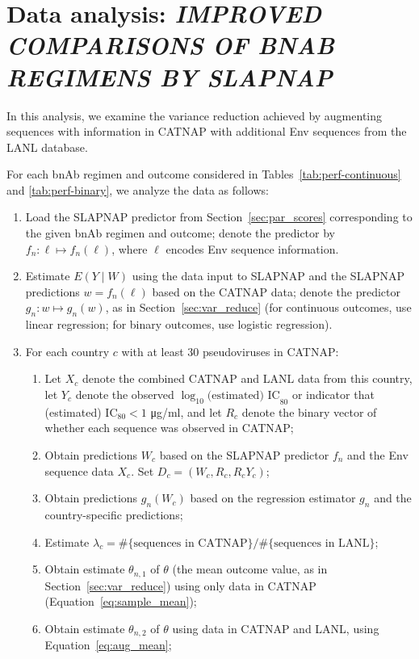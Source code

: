 \documentclass[10pt]{article}
\begin{document}
\section*{Data analysis: \textit{IMPROVED COMPARISONS OF BNAB REGIMENS BY SLAPNAP}}

In this analysis, we examine the variance reduction achieved by augmenting sequences with information in CATNAP with additional Env sequences from the LANL database.

For each bnAb regimen and outcome considered in Tables~\ref{tab:perf-continuous} and \ref{tab:perf-binary}, we analyze the data as follows:
\begin{enumerate}
  \item Load the SLAPNAP predictor from Section~\ref{sec:par_scores} corresponding to the given bnAb regimen and outcome; denote the predictor by $f_n: \ell \mapsto f_n(\ell)$, where $\ell$ encodes Env sequence information.
  \item Estimate $E(Y \mid W)$ using the data input to SLAPNAP and the SLAPNAP predictions $w = f_n(\ell)$ based on the CATNAP data; denote the predictor $g_n: w \mapsto g_n(w)$, as in Section~\ref{sec:var_reduce} (for continuous outcomes, use linear regression; for binary outcomes, use logistic regression).
  \item For each country $c$ with at least 30 pseudoviruses in CATNAP:
  \begin{enumerate}
    \item Let $X_c$ denote the combined CATNAP and LANL data from this country, let $Y_c$ denote the observed $\log_{10} \text{(estimated) IC}_{80}$ or indicator that (estimated) IC$_{80} < 1$ \si{\ug}/ml, and let $R_c$ denote the binary vector of whether each sequence was observed in CATNAP;
    \item Obtain predictions $W_c$ based on the SLAPNAP predictor $f_n$ and the Env sequence data $X_c$. Set $D_c = (W_c, R_c, R_cY_c)$;
    \item Obtain predictions $g_n(W_c)$ based on the regression estimator $g_n$ and the country-specific predictions;
    \item Estimate $\lambda_c = \#\{\text{sequences in CATNAP}\} / \#\{\text{sequences in LANL}\}$;
    \item Obtain estimate $\theta_{n,1}$ of $\theta$ (the mean outcome value, as in Section~\ref{sec:var_reduce}) using only data in CATNAP (Equation~\ref{eq:sample_mean});
    \item Obtain estimate $\theta_{n,2}$ of $\theta$ using data in CATNAP and LANL, using Equation~\eqref{eq:aug_mean};

\end{enumerate}
\end{enumerate}
\end{document}
